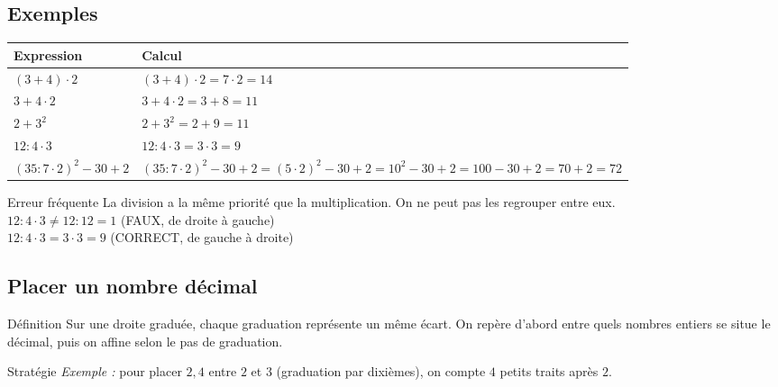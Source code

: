 \subsection{Exemples}

\vspace{-4pt}\def\arraystretch{1.15}
\begin{tabularx}{\linewidth}{|>{\centering\arraybackslash}p{4cm}|X|}
\hline
\cellcolor{themeNO!30}\textbf{Expression} & \cellcolor{themeNO!30}\textbf{Calcul} \\\hline
$(3 + 4) \cdot 2$ & $(3 + 4) \cdot 2 = 7 \cdot 2 = 14$ \\\hline
$3 + 4 \cdot 2$ & $3 + 4 \cdot 2 = 3 + 8 = 11$ \\\hline
$2 + 3^2$ & $2 + 3^2 = 2 + 9 = 11$ \\\hline
$12 : 4 \cdot 3$ & $12 : 4 \cdot 3 = 3 \cdot 3 = 9$ \\\hline
$(35:7\cdot2)^2 -30 + 2$ & $(35:7\cdot2)^2 -30 + 2 = (5\cdot2)^2 -30 + 2= 10^2 -30 + 2= 100 -30 + 2=70+2 =72$ \\\hline
\end{tabularx}
\def\arraystretch{1}

\begin{astuce}{Erreur fréquente}
La division a la même priorité que la multiplication. On ne peut pas les regrouper entre eux.\\[7pt]
$12 : 4 \cdot 3 \ne 12 : 12 = 1$ (FAUX, de droite à gauche)\\[3pt]
$12 : 4 \cdot 3 = 3 \cdot 3 =9$ (CORRECT, de gauche à droite)
\end{astuce}

\newpage
\semaineinvisible
{} 

\vfill
\subsection{Placer un nombre décimal}

\begin{regle}{Définition}
Sur une droite graduée, chaque graduation représente un même écart. On repère d'abord entre quels nombres entiers se situe le décimal, puis on affine selon le pas de graduation.
\end{regle}

\vspace{6pt}
\begin{astuce}{Stratégie}
\textit{Exemple :} pour placer $2,4$ entre $2$ et $3$ (graduation par dixièmes), on compte $4$ petits traits après $2$.
\end{astuce}

